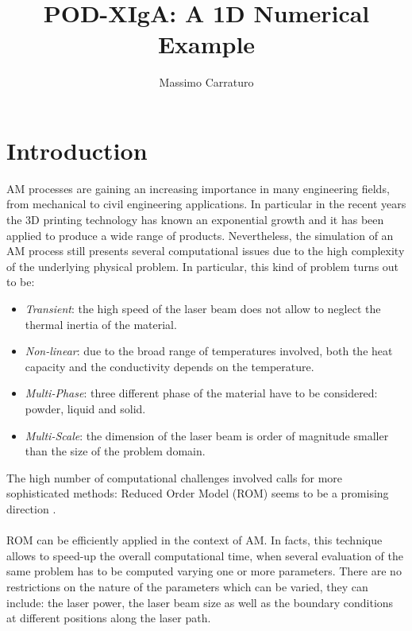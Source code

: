 \documentclass[3p]{article}
\begin{document}
\title { POD-XIgA: A 1D Numerical Example}
\author{Massimo Carraturo}

\maketitle


\section*{Introduction}
AM processes are gaining an increasing importance in many engineering fields, from mechanical to civil engineering applications. In particular in the recent years the 3D printing technology has known an exponential growth and it has been applied to produce a wide range of products.
Nevertheless, the simulation of an AM process still presents several computational issues due to the high complexity of the underlying physical problem. In particular, this kind of problem turns out to be:
\begin{itemize}
\item \textit{Transient}: the high speed of the laser beam does not allow to neglect the thermal inertia of the material.
\item \textit{Non-linear}: due to the broad range of temperatures involved, both the heat capacity and the conductivity depends on the temperature.
\item \textit{Multi-Phase}: three different phase of the material have to be considered: powder, liquid and solid.
\item \textit{Multi-Scale}: the dimension of the laser beam is order of magnitude smaller than the size of the problem domain.
\end{itemize}
The high number of computational challenges involved calls for more sophisticated methods: Reduced Order Model (ROM) seems to be a promising direction \cite{Rozza2009}.
\\
\\
\indent ROM can be efficiently applied in the context of AM. In facts, this technique allows to speed-up the overall computational time, when several evaluation of the same problem has to be computed varying one or more parameters. There are no restrictions on the nature of the parameters which can be varied, they can include: the laser power, the laser beam size as well as the boundary conditions at different positions along the laser path.
\end{document}
